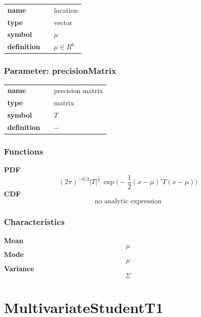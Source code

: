 \noindent\begin{tabular}{p{2cm}cl}
\textbf{name} & & location \\
\textbf{type} & & vector \\
\textbf{symbol} & & $\mu$  \\
\textbf{definition} & & $\mu \in R^k$
\end{tabular}
\subsubsection*{Parameter: precisionMatrix}

\noindent\begin{tabular}{p{2cm}cl}
\textbf{name} & & precision matrix \\
\textbf{type} & & matrix \\
\textbf{symbol} & & $T$  \\
\textbf{definition} & & $-$
\end{tabular}
\subsubsection*{Functions}

\smallskip \noindent \hspace{.2cm} \textbf{PDF} 
\begin{equation*}(2\pi)^{-d/2}|T|^{\frac{1}{2}}\, \exp\big( -\frac{1}{2}(x-\mu)' T (x-\mu) \big)\end{equation*}
\smallskip \noindent \hspace{.2cm} \textbf{CDF} 
\begin{equation*}\text{no analytic expression}\end{equation*}
\smallskip
\subsubsection*{Characteristics}
\smallskip \noindent \hspace{.2cm} \textbf{Mean} 
\begin{equation*}\mu\end{equation*}
\smallskip \noindent \hspace{.2cm} \textbf{Mode} 
\begin{equation*}\mu\end{equation*}
\smallskip \noindent \hspace{.2cm} \textbf{Variance} 
\begin{equation*}\Sigma\end{equation*}
\smallskip
\section*{MultivariateStudentT1} 

